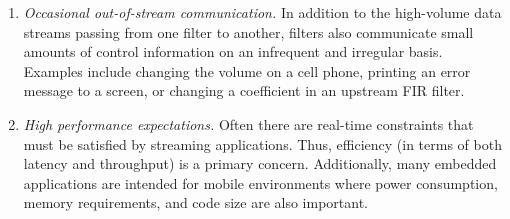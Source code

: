 \begin{enumerate}
\item \emph{Occasional out-of-stream communication.}  In addition to
  the  high-volume data streams  passing from  one filter  to another,
  filters also communicate small  amounts of control information on an
  infrequent  and  irregular  basis.   Examples include  changing  the
  volume on  a cell phone, printing  an error message to  a screen, or
  changing a coefficient in an upstream FIR filter.
  
\item \emph{High performance expectations.}  Often there are real-time
  constraints that must be  satisfied by streaming applications. Thus,
  efficiency (in  terms of both  latency and throughput) is  a primary
  concern.  Additionally, many  embedded applications are intended for
  mobile  environments where  power consumption,  memory requirements,
  and code size are also important.
\end{enumerate}
